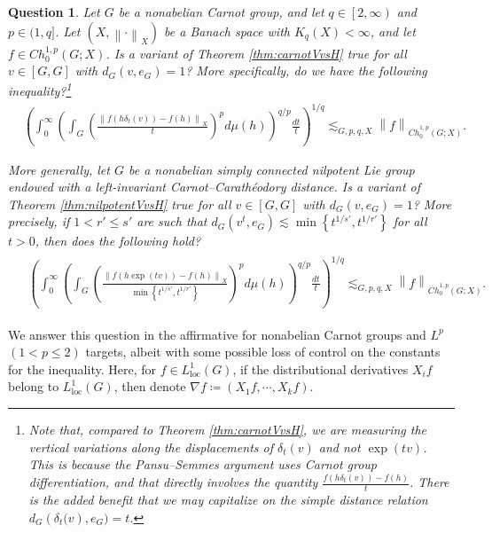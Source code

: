\documentclass[11pt,reqno]{amsart}
\newtheorem{question}[theorem]{Question}
\newcommand{\1}{\mathbf 1}
\begin{document}
\begin{question}\label{ques:full commutator}
Let $G$ be a nonabelian Carnot group, and let $q\in \left[2,\infty\right)$ and $p\in (1,q]$. Let $\left(X,\left\|\cdot\right\|_X\right)$ be a Banach space with $K_q\left(X\right)<\infty$, and let $f\in Ch_0^{1,p}\left(G;X\right)$. Is a variant of Theorem \ref{thm:carnotVvsH} true for all $v\in \left[G,G\right]$ with $d_G\left(v,e_G\right)=1$? More specifically, do we have the following inequality?\footnote{Note that, compared to Theorem \ref{thm:carnotVvsH}, we are measuring the vertical variations along the displacements of $\delta_t(v)$ and not $\exp\left(tv\right)$. This is because the Pansu--Semmes argument uses Carnot group differentiation, and that directly involves the quantity $\frac{f\left(h\delta_t\left(v\right)\right)-f\left(h\right)}{t}$. There is the added benefit that we may capitalize on the simple distance relation $d_G\left(\delta_t(v\right),e_G)=t$.}
\begin{align*}
&\left(\int_0^\infty \left(\int_{G}\left(\frac{\left\|f\left(h\delta_t\left(v\right)\right)-f\left(h\right)\right\|_X}{t}\right)^pd\mu\left(h\right)\right)^{q/p}\frac{dt}{t}\right)^{1/q}\lesssim_{G,p,q,X}  \left\|f\right\|_{\dot{Ch}^{1,p}_0\left(G;X\right)}.
\end{align*}

More generally, let $G$ be a nonabelian simply connected nilpotent Lie group endowed with a left-invariant Carnot--Carath\'eodory distance. Is a variant of Theorem \ref{thm:nilpotentVvsH} true for all $v\in \left[G,G\right]$ with $d_G\left(v,e_G\right)=1$? More precisely, if $1<r'\le s'$ are such that $d_G\left(v^t,e_G\right)\lesssim \min\left\{t^{1/s'},t^{1/r'}\right\}$ for all $t>0$, then does the following hold?
\begin{align*}
\begin{aligned}
&\left(\int_0^\infty \left(\int_{G}\left(\frac{\left\|f\left(h\exp\left(tv\right)\right)-f\left(h\right)\right\|_X}{\min\left\{t^{1/s'},t^{1/r'}\right\}}\right)^pd\mu\left(h\right)\right)^{q/p}\frac{dt}{t}\right)^{1/q}\lesssim_{G,p,q,X} \left\|f\right\|_{\dot{Ch}^{1,p}_0\left(G;X\right)}.
\end{aligned}
\end{align*}
\end{question}

We answer this question in the affirmative for nonabelian Carnot groups and $L^p$ $\left(1<p\le 2\right)$ targets, albeit with some possible loss of control on the constants for the inequality. Here, for $f\in L^1_{\mathrm{loc}}\left(G\right)$, if the distributional derivatives $X_if$ belong to $L^1_{\mathrm{loc}}\left(G\right)$, then denote $\nabla f\coloneqq\left(X_1f,\cdots,X_kf\right)$.
\end{document}
